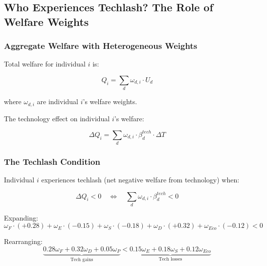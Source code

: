 \subsection{Who Experiences Techlash? The Role of Welfare Weights}

\subsubsection{Aggregate Welfare with Heterogeneous Weights}

Total welfare for individual $i$ is:

\begin{equation}
Q_i = \sum_d \omega_{d,i} \cdot U_d
\end{equation}

where $\omega_{d,i}$ are individual $i$'s welfare weights.

The technology effect on individual $i$'s welfare:

\begin{equation}
\Delta Q_i = \sum_d \omega_{d,i} \cdot \beta_d^{tech} \cdot \Delta T
\label{eq:individual-tech-effect}
\end{equation}

\subsubsection{The Techlash Condition}

Individual $i$ experiences techlash (net negative welfare from technology) when:

\begin{equation}
\Delta Q_i < 0 \quad \Leftrightarrow \quad \sum_d \omega_{d,i} \cdot \beta_d^{tech} < 0
\end{equation}

Expanding:
\begin{equation}
\omega_F \cdot (+0.28) + \omega_E \cdot (-0.15) + \omega_S \cdot (-0.18) + \omega_D \cdot (+0.32) + \omega_{Eco} \cdot (-0.12) < 0
\end{equation}

Rearranging:
\begin{equation}
\underbrace{0.28\omega_F + 0.32\omega_D + 0.05\omega_P}_{\text{Tech gains}} < \underbrace{0.15\omega_E + 0.18\omega_S + 0.12\omega_{Eco}}_{\text{Tech losses}}
\label{eq:techlash-condition}
\end{equation}

